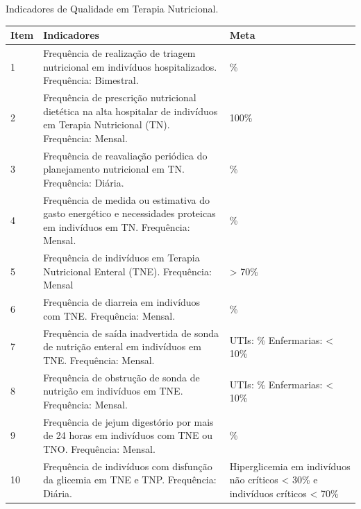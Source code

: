 \begin{quadro}[htb]
\caption{\label{quadro_indicadoresQTN}Indicadores de Qualidade em Terapia Nutricional.}
\label{}
\begin{tabular}{|p{1cm}|p{9cm}|p{5cm}|}
	\hline
	\textbf{Item} & \textbf{Indicadores} & \textbf{Meta} \\ \hline
	1 & Frequência de realização de triagem nutricional em indivíduos hospitalizados. \newline Frequência: Bimestral. & \geq 80\% \\ \hline
	2 & Frequência de prescrição nutricional dietética na alta hospitalar de indivíduos em Terapia Nutricional (TN). \newline Frequência: Mensal. & 100\% \\ \hline
	3 & Frequência de reavaliação periódica do planejamento nutricional em TN. \newline Frequência: Diária. & \geq 85\% \\ \hline
	4 & Frequência de medida ou estimativa do gasto energético e necessidades proteicas
em indivíduos em TN. \newline Frequência: Mensal. & \geq 80\% \\ \hline
	5 & Frequência de indivíduos em Terapia Nutricional Enteral (TNE). \newline Frequência: Mensal & > 70\% \\ \hline
	6 & Frequência de diarreia em indivíduos com TNE. \newline Frequência: Mensal. & \leq 10\% \\ \hline
    7 & Frequência de saída inadvertida de sonda de nutrição enteral em indivíduos em
TNE. \newline Frequência: Mensal. & UTIs: \leq 5\% \newline Enfermarias: < 10\%  \\ \hline
    8 & Frequência de obstrução de sonda de nutrição em indivíduos em TNE. \newline Frequência: Mensal. & UTIs: \leq 5\% \newline Enfermarias: < 10\%  \\ \hline
    9 & Frequência de jejum digestório por mais de 24 horas em indivíduos com TNE
ou TNO. \newline Frequência: Mensal. & \leq 10\% \\ \hline
    10 & Frequência de indivíduos com disfunção da glicemia em TNE e TNP. \newline Frequência: Diária. & Hiperglicemia em indivíduos não críticos < 30\% e indivíduos críticos < 70\% \\ \hline

\end{tabular}
\end{quadro}
